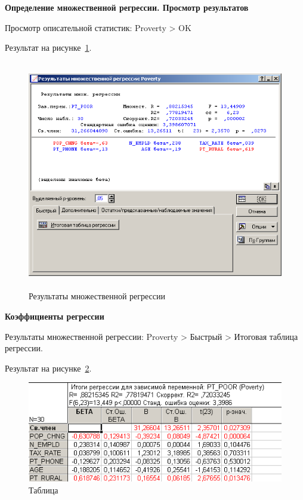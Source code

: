 \newpage

\begin{center}
  \textbf{Определение множественной регрессии. Просмотр результатов}
\end{center}

Просмотр описательной статистик: Proverty > OK

Результат на рисунке~\ref{fig:example_19}.

\begin{figure}[!h]
  \centering

  \includegraphics[height=10cm]
  {inc/example_19.PNG}

  \caption{Результаты множественной регрессии}

  \label{fig:example_19}
\end{figure}

\newpage

\begin{center}
  \textbf{Коэффициенты регрессии}
\end{center}

Результаты множественной регрессии: Proverty > Быстрый > Итоговая таблица регрессии.

Результат на рисунке~\ref{fig:example_20}.

\begin{figure}[!h]
  \centering

  \includegraphics[width=12cm]
  {inc/example_20.PNG}

  \caption{Таблица}

  \label{fig:example_20}
\end{figure}

